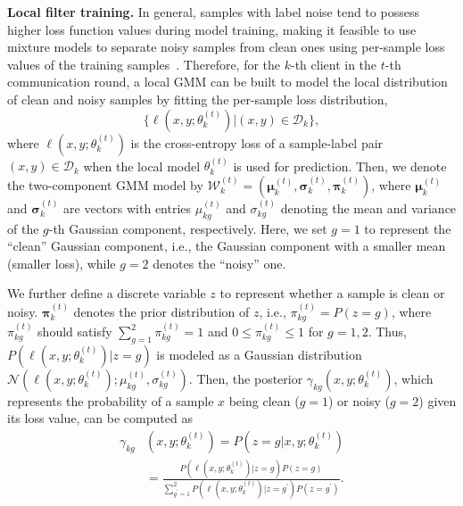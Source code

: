 \documentclass[letterpaper]{article} %
\begin{document}
\noindent
\textbf{Local filter training.} 
In general, samples with label noise tend to possess higher loss function values during model training, making it feasible to use mixture models to separate noisy samples from clean ones using per-sample loss values of the training samples~\cite{BMM, li2019dividemix}. 
Therefore, for the $k$-th client in the $t$-th communication round, 
a local GMM can be built to model the local distribution of clean and noisy samples by fitting the per-sample loss distribution,
\begin{equation}
    \{\ell(x,y;{\theta}_{k}^{(t)})|(x,y)\in\mathcal{D}_{k}\},
\end{equation}
where $\ell(x,y;{\theta}_{k}^{(t)})$ is the cross-entropy loss of a sample-label pair $(x, y)\in\mathcal{D}_{k}$ when the local model ${\theta}_{k}^{(t)}$ is used for prediction. Then, we denote the two-component GMM model by $\mathcal{W}_{k}^{(t)}=(\bm{{\mu}}_{k}^{(t)},\bm{{\sigma}}_{k}^{(t)},{\bm{\pi}}_{k}^{(t)})$, 
where $\bm{{\mu}}_{k}^{(t)}$ and $\bm{{\sigma}}_{k}^{(t)}$ are vectors with entries ${{\mu}}_{kg}^{(t)}$ and ${\sigma}_{kg}^{(t)}$ denoting the mean and variance of the $g$-th Gaussian component, respectively. Here, we set $g=1$ to represent the ``clean'' Gaussian component, i.e., the Gaussian component with a smaller mean (smaller loss), while $g=2$ denotes the ``noisy'' one.

We further define a discrete variable $z$ to represent whether a sample is clean or noisy. ${\bm{\pi}}_{k}^{(t)}$ denotes the prior distribution of $z$, i.e., ${{\pi}}_{kg}^{(t)}=P(\!z\!=\!g\!)$, where ${{\pi}}_{kg}^{(t)}$ should satisfy  $\sum_{g=1}^{2}{{\pi}}_{kg}^{(t)}=1$ and $0 \le{{\pi}}_{kg}^{(t)}\le 1$ for $g=1, 2$. 
Thus, $P(\ell(x,y;{\theta}_{k}^{(t)})|z=g)$ is modeled as a Gaussian distribution $\mathcal{N}(\ell(x,y;{\theta}_{k}^{(t)}); \mu_{kg}^{(t)}, \sigma_{kg}^{(t)})$.
Then, the posterior ${\gamma}_{kg}(x,y;{\theta}_{k}^{(t)})$, which represents the probability of a sample $x$ being clean ($g=1$) or noisy ($g=2$) given its loss value, can be computed as
 \begin{equation}
    \label{Equation:E-step}
    \begin{split}
        {\gamma}_{kg}&(x,y;{\theta}_{k}^{(t)}) = P(z=g|x,y;{\theta}_{k}^{(t)})\\ &= \frac{P(\ell(x,y;{\theta}_{k}^{(t)})|z=g) P(z=g)}{\sum_{g^{\prime}=1}^{2} P(\ell(x,y;{\theta}_{k}^{(t)})|z=g^{\prime}) P(z=g^{\prime})}.
    \end{split}
\end{equation}
\end{document}
